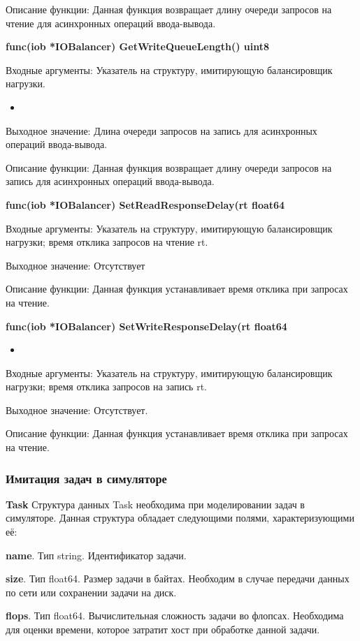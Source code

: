 Описание функции: Данная функция возвращает длину очереди запросов на чтение для асинхронных операций ввода-вывода.

\textbf{func(iob *IOBalancer) GetWriteQueueLength() uint8}

Входные аргументы: Указатель на структуру, имитирующую балансировщик нагрузки.
\begin{itemize}
	\item 
\end{itemize}
Выходное значение: Длина очереди запросов на запись для асинхронных операций ввода-вывода. 

Описание функции: Данная функция возвращает длину очереди запросов на запись для асинхронных операций ввода-вывода.

\textbf{func(iob *IOBalancer) SetReadResponseDelay(rt float64}

Входные аргументы: Указатель на структуру, имитирующую балансировщик нагрузки; время отклика запросов на чтение rt.

Выходное значение: Отсутствует 

Описание функции: Данная функция устанавливает время отклика при запросах на чтение.

\textbf{func(iob *IOBalancer) SetWriteResponseDelay(rt float64}
\begin{itemize}
	\item 
\end{itemize}
Входные аргументы: Указатель на структуру, имитирующую балансировщик нагрузки; время отклика запросов на запись rt.

Выходное значение: Отсутствует.

Описание функции: Данная функция устанавливает время отклика при запросах на чтение.

\subsubsection{Имитация задач в симуляторе}
\textbf{Task}
Структура данных Task необходима при моделировании задач в симуляторе. Данная структура обладает следующими полями, характеризующими  её:

\textbf{	name}. Тип  string. Идентификатор задачи.

\textbf{	size}. Тип float64. Размер задачи в байтах. Необходим в случае передачи данных по сети или сохранении задачи на диск.

\textbf{	flops}. Тип   float64. Вычислительная сложность задачи во флопсах. Необходима для оценки времени, которое затратит хост при обработке данной задачи.

